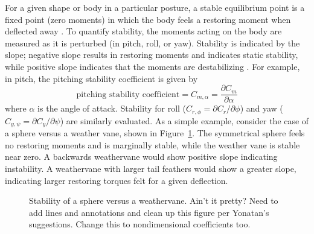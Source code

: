 For a given shape or body in a particular posture, a stable equilibrium point is a fixed point (zero moments) in which the body feels a restoring moment when deflected away \cite{McCormick:1995, Etkin:1996, McCay:2001, McCay:2001a, plos:part1}.  To quantify stability, the moments acting on the body are measured as it is perturbed (in pitch, roll, or yaw). Stability is indicated by the slope; negative slope results in restoring moments and indicates static stability, while positive slope indicates that the moments are destabilizing \cite{McCormick:1995, Etkin:1996, McCay:2001}.  For example, in pitch, the pitching stability coefficient is given by 
\begin{equation}
\mbox{pitching stability coefficient} =
C_{m,\alpha} = \frac{\partial C_m}{\partial \alpha}
\end{equation}
where $\alpha$ is the angle of attack.  Stability for roll ($C_{r,\phi} = \partial C_r / \partial \phi$) and yaw ($C_{y,\psi} = \partial C_y / \partial \psi$) are similarly evaluated. As a simple example, consider the case of a sphere versus a weather vane, shown in Figure~\ref{fig:sphere}.  The symmetrical sphere feels no restoring moments and is marginally stable, while the weather vane is stable near zero.  A backwards weathervane would show positive slope indicating instability.  A weathervane with larger tail feathers would show a greater slope, indicating larger restoring torques felt for a given deflection.   
\begin{figure}[!ht]
\begin{center}
\end{center}
\caption{
{ Stability of a sphere versus a weathervane.}  Ain't it pretty? Need to add lines and annotations and clean up this figure per Yonatan's suggestions. Change this to nondimensional coefficients too.}
\label{fig:sphere}
\end{figure}

